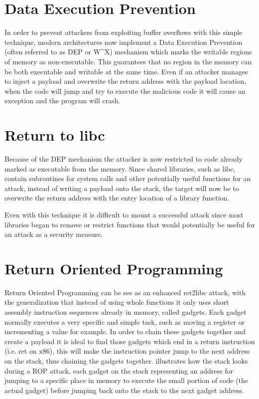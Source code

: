 

\section{Data Execution Prevention}
\label{sec:dep}

In order to prevent attackers from exploiting buffer overflows with this simple technique, modern architectures now implement a Data Execution Prevention\cite{peslyak1997dep} (often referred to as DEP or W\textasciicircum X) mechanism which marks the writable regions of memory as non-executable. This guarantees that no region in the memory can be both executable and writable at the same time. Even if an attacker manages to inject a payload and overwrite the return address with the payload location, when the code will jump and try to execute the malicious code it will cause an exception and the program will crash.

\section{Return to libc}
\label{sec:ret2libc}

Because of the DEP mechanism the attacker is now restricted to code already marked as executable from the memory. Since shared libraries, such as libc, contain subroutines for system calls and other potentially useful functions for an attack, instead of writing a payload onto the stack, the target will now be to overwrite the return address with the entry location of a library function.

Even with this technique\cite{peslyak1997ret2libc}\cite{nergal2001ret2libc} it is difficult to mount a successful attack since most libraries began to remove or restrict functions that would potentially be useful for an attack as a security measure.

\section{Return Oriented Programming}
\label{sec:rop}

Return Oriented Programming can be see as an enhanced ret2libc attack, with the generalization that instead of using whole functions it only uses short assembly instruction sequences already in memory, called gadgets. Each gadget normally executes a very specific and simple task, such as moving a register or incrementing a value for example. In order to chain these gadgets together and create a payload it is ideal to find those gadgets which end in a return instruction (i.e. ret on x86), this will make the instruction pointer jump to the next address on the stack, thus chaining the gadgets together.  illustrates how the stack looks during a ROP attack, each gadget on the stack representing an address for jumping to a specific place in memory to execute the small portion of code (the actual gadget) before jumping back onto the stack to the next gadget address.

